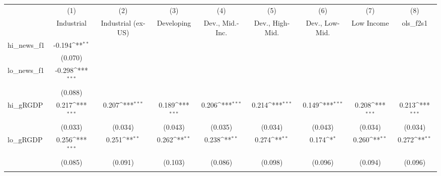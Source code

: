 {
\def\sym#1{\ifmmode^{#1}\else\(^{#1}\)\fi}
\begin{tabular}{l*{8}{c}}
\toprule
            &\multicolumn{1}{c}{(1)}&\multicolumn{1}{c}{(2)}&\multicolumn{1}{c}{(3)}&\multicolumn{1}{c}{(4)}&\multicolumn{1}{c}{(5)}&\multicolumn{1}{c}{(6)}&\multicolumn{1}{c}{(7)}&\multicolumn{1}{c}{(8)}\\
            &\multicolumn{1}{c}{Industrial}&\multicolumn{1}{c}{Industrial (ex-US)}&\multicolumn{1}{c}{Developing}&\multicolumn{1}{c}{Dev., Mid.-Inc.}&\multicolumn{1}{c}{Dev., High-Mid.}&\multicolumn{1}{c}{Dev., Low-Mid.}&\multicolumn{1}{c}{Low Income}&\multicolumn{1}{c}{ols\_f2s1}\\
\midrule
hi\_news\_f1  &      -0.194\sym{**} &                     &                     &                     &                     &                     &                     &                     \\
            &     (0.070)         &                     &                     &                     &                     &                     &                     &                     \\
\addlinespace
lo\_news\_f1  &      -0.298\sym{***}&                     &                     &                     &                     &                     &                     &                     \\
            &     (0.088)         &                     &                     &                     &                     &                     &                     &                     \\
\addlinespace
hi\_gRGDP    &       0.217\sym{***}&       0.207\sym{***}&       0.189\sym{***}&       0.206\sym{***}&       0.214\sym{***}&       0.149\sym{***}&       0.208\sym{***}&       0.213\sym{***}\\
            &     (0.033)         &     (0.034)         &     (0.043)         &     (0.035)         &     (0.034)         &     (0.043)         &     (0.034)         &     (0.034)         \\
\addlinespace
lo\_gRGDP    &       0.256\sym{***}&       0.251\sym{**} &       0.262\sym{**} &       0.238\sym{**} &       0.274\sym{**} &       0.174\sym{*}  &       0.260\sym{**} &       0.272\sym{**} \\
            &     (0.085)         &     (0.091)         &     (0.103)         &     (0.086)         &     (0.098)         &     (0.096)         &     (0.094)         &     (0.096)         \\
\addlinespace

\end{tabular}}
